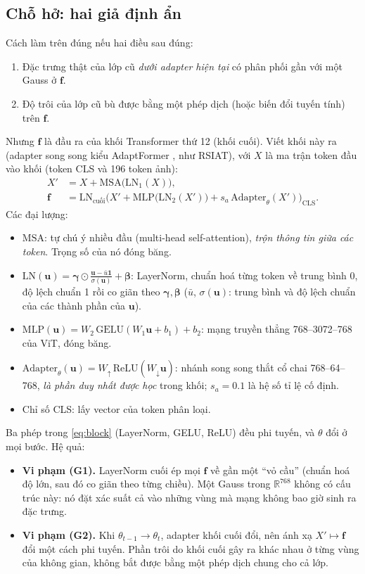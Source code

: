 \documentclass[11pt]{article}
\newcommand{\R}{\mathbb{R}}
\newcommand{\vf}{\mathbf{f}}
\newcommand{\vu}{\mathbf{u}}
\newcommand{\LN}{\mathrm{LN}}
\begin{document}
\subsection{Chỗ hở: hai giả định ẩn}\label{sec:gap}
Cách làm trên đúng nếu hai điều sau đúng:
\begin{enumerate}
\item[(G1)] Đặc trưng thật của lớp cũ \emph{dưới adapter hiện tại} có phân phối gần với một Gauss ở $\vf$.
\item[(G2)] Độ trôi của lớp cũ bù được bằng một phép dịch (hoặc biến đổi tuyến tính) trên $\vf$.
\end{enumerate}
Nhưng $\vf$ là đầu ra của khối Transformer thứ 12 (khối cuối). Viết khối này ra (adapter song song kiểu AdaptFormer
\cite{adaptformer}, như RSIAT), với $X$ là ma trận token đầu vào khối (token CLS và 196 token ảnh):
\begin{align}
X' &= X + \mathrm{MSA}\big(\LN_1(X)\big), \label{eq:attn}\\
\vf &= \LN_{\text{cuối}}\Big(X' + \mathrm{MLP}\big(\LN_2(X')\big) + s_a\,\mathrm{Adapter}_\theta(X')\Big)_{\text{CLS}}.
\label{eq:block}
\end{align}
Các đại lượng:
\begin{itemize}
\item $\mathrm{MSA}$: tự chú ý nhiều đầu (multi-head self-attention), \emph{trộn thông tin giữa các token}. Trọng số của
      nó đóng băng.
\item $\LN(\vu)=\boldsymbol\gamma\odot\frac{\vu-\bar u\mathbf 1}{\sigma(\vu)}+\boldsymbol\beta$: LayerNorm, chuẩn hoá
      từng token về trung bình 0, độ lệch chuẩn 1 rồi co giãn theo $\boldsymbol\gamma,\boldsymbol\beta$ ($\bar u$,
      $\sigma(\vu)$: trung bình và độ lệch chuẩn của các thành phần của $\vu$).
\item $\mathrm{MLP}(\vu)=W_2\,\mathrm{GELU}(W_1\vu+b_1)+b_2$: mạng truyền thẳng 768--3072--768 của ViT, đóng băng.
\item $\mathrm{Adapter}_\theta(\vu)=W_{\uparrow}\,\mathrm{ReLU}(W_{\downarrow}\vu)$: nhánh song song thắt cổ chai
      768--64--768, \emph{là phần duy nhất được học} trong khối; $s_a=0.1$ là hệ số tỉ lệ cố định.
\item Chỉ số CLS: lấy vector của token phân loại.
\end{itemize}
Ba phép trong \eqref{eq:block} (LayerNorm, GELU, ReLU) đều phi tuyến, và $\theta$ đổi ở mọi bước. Hệ quả:
\begin{itemize}
\item \textbf{Vi phạm (G1).} LayerNorm cuối ép mọi $\vf$ về gần một ``vỏ cầu'' (chuẩn hoá độ lớn, sau đó co giãn theo
      từng chiều). Một Gauss trong $\R^{768}$ không có cấu trúc này: nó đặt xác suất cả vào những vùng mà mạng không bao
      giờ sinh ra đặc trưng.
\item \textbf{Vi phạm (G2).} Khi $\theta_{t-1}\to\theta_t$, adapter khối cuối đổi, nên ánh xạ $X'\mapsto\vf$ đổi một
      cách phi tuyến. Phần trôi do khối cuối gây ra khác nhau ở từng vùng của không gian, không bắt được bằng một phép
      dịch chung cho cả lớp.
\end{itemize}
\end{document}
